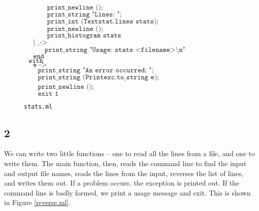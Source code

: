 \documentclass[]{book}
\begin{document}
\begin{figure}
\begin{center}
{\begin{minipage}{0.9\textwidth}
$\texttt{~~~~~~~~~~print\_newline ();}$\\
$\texttt{~~~~~~~~~~print\_string "Lines:\ ";}$\\
$\texttt{~~~~~~~~~~print\_int (Textstat.lines stats);}$\\
$\texttt{~~~~~~~~~~print\_newline ();}$\\
$\texttt{~~~~~~~~~~print\_histogram stats}$\\
$\texttt{~~~~| \_ ->}$\\
$\texttt{~~~~~~~~~print\_string "Usage:\ stats <filename>\textbackslash n"}$\\
$\texttt{~~~~end}$\\
$\texttt{~~with}$\\
$\texttt{~~~~e ->}$\\
$\texttt{~~~~~~print\_string "An error occurred:\ ";}$\\
$\texttt{~~~~~~print\_string (Printexc.to\_string e);}$\\
$\texttt{~~~~~~print\_newline ()}$;\\
$\texttt{~~~~~~exit 1}$\vphantom{g}
\end{minipage}}
\end{center}
\caption{\small\texttt{stats.ml}}
\label{q1a.ml}
\end{figure}

\subsection*{2}

We can write two little functions -- one to read all the lines from a file, and one to write them. The main function, then, reads the command line to find the input and output file names, reads the lines from the input, reverses the list of lines, and writes them out. If a problem occurs, the exception is printed out. If the command line is badly formed, we print a usage message and exit. This is shown in Figure \ref{reverse.ml}.
\end{document}
